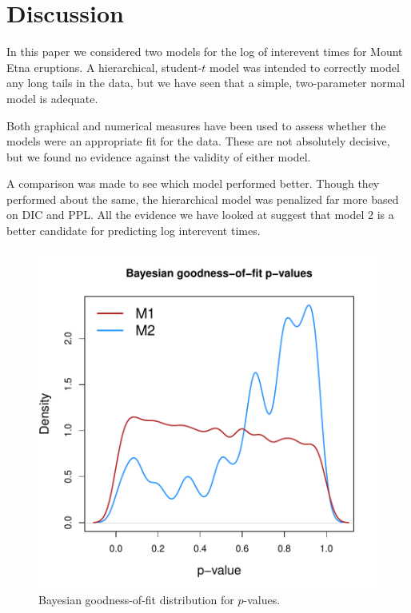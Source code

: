 \documentclass{asaproc}
\begin{document}
\section{Discussion}

In this paper we considered two models for the log of interevent times for Mount Etna eruptions. A hierarchical, student-$t$ model was intended to correctly model any long tails in the data, but we have seen that a simple, two-parameter normal model is adequate.

Both graphical and numerical measures have been used to assess whether the models were an appropriate fit for the data. These are not absolutely decisive, but we found no evidence against the validity of either model.

A comparison was made to see which model performed better. Though they performed about the same, the hierarchical model was penalized far more based on DIC and PPL. All the evidence we have looked at suggest that model 2 is a better candidate for predicting log interevent times.

\begin{figure}
\centering
\includegraphics[scale=0.50]{figs/gof.pdf}
\caption{Bayesian goodness-of-fit distribution for $p$-values. \\}
\label{gof}
\end{figure}
\end{document}
